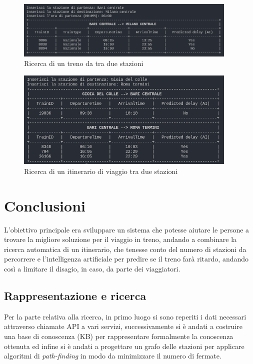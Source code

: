 \documentclass[italian,12pt,a4paper]{article}
\begin{document}
		\begin{figure}[!h]
			\centering
			\includegraphics[width=400px]{img/search_train}
			\caption{Ricerca di un treno da tra due stazioni}
		\end{figure}

		\begin{figure}[!h]
			\centering
			\includegraphics[width=400px]{img/search_itin}
			\caption{Ricerca di un itinerario di viaggio tra due stazioni}
		\end{figure}
		
	\section{Conclusioni}
		L'obiettivo principale era sviluppare un sistema che potesse aiutare le persone a trovare la migliore soluzione per il viaggio in treno, andando a combinare la ricerca automatica di un itinerario, che tenesse conto del numero di stazioni da percorrere e l'intelligenza artificiale per predire se il treno farà ritardo, andando così a limitare il disagio, in caso, da parte dei viaggiatori.
		
		\subsection{Rappresentazione e ricerca}
			Per la parte relativa alla ricerca, in primo luogo si sono reperiti i dati necessari attraverso chiamate API a vari servizi, successivamente si è andati a costruire una base di conoscenza (KB) per rappresentare formalmente la conoscenza ottenuta ed infine si è andati a progettare un grafo delle stazioni per applicare algoritmi di \textit{path-finding} in modo da minimizzare il numero di fermate.
		
\end{document}
